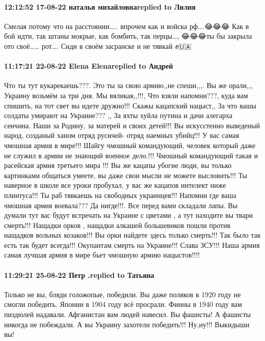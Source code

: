 \paragraph{12:12:52 17-08-22 наталья михайловнаreplied to Лилия}

Смелая потому что на расстоянии….. впрочем как и войска рф….😂😂😂 Как в бой
идти, так штаны мокрые, как бомбить, так перцы…, 😂😂😂ты бы закрыла ото своё……
рот…. Сиди в своём засранске и не тявкай ✊🇺🇦

\paragraph{11:17:21 22-08-22 Elena Elenareplied to Андрей}

Что ты тут кукарекаешь???. Это ты за свою армию,,не спеши,,,. Вы же орали,,,
Украину возьмём за три дня. Мы вяликая,,!!!, Что взяли напомни???, куда вам
спишить, на тот свет вы идете дружно!!! Скажы кацапский нацыст,, За что вашы
солдаты умирают на Украине??? ,, За яхты хуйла путина и дачи алегарха сенчина.
Наши за Родину, за матерей и своих детей!!! Вы искусстенно выведеный народ,
созданый ханом отряд русичей- отряд наемных убийц!!! У вас самая чмошная армия
в мире!!! Шайгу чмошный командующий, человек который даже не служил в армии не
знающий военное дело.!!! Чмошный командующий такая и расейская армия третьего
мира !!! Вы же кацапы убогие люди, вы только картинками общаться умеете, вы
даже свои мысли не можете высловить!!! Ты наверное в школе все уроки пробухал,
у вас же кацапов интелект ниже плинтуса!!! Ты раб тявкаешь на свободных
украинцев!!! Напомни где ваша чмошная армия воевала??? Да нигде!!!. Все перед
вами складали лапы. Вы думали тут вас будут встречать на Украине с цветами , а
тут находите вы твари смерть!!! Нащадки орков , нащадки алкашей большевиков
пошли против нащадков вольных козаков!!! Вы орки найдете здесь только смерть!!!
Так было так есть так будет всегда!!! Окупантам смерть на Украине!!! Слава
ЗСУ!!! Наша армия самая лучшая армия в мире бьет чмошную армию нацыстов!!!!

\paragraph{11:29:21 25-08-22 Петр .replied to Татьяна}

Только не вы, бляди голожопые, победили. Вы даже поляков в 1920 году не смогли
победить. Японии в 1904 году всё просрали. Финны в 1940 году вам пиздюлей
надавали. Афганистан вам людей навесил. Вы фашисты! А фашисты никогда не
побеждали. А вы Украину захотели победить!!! Ну,ну!!! Выкидыши вы!

